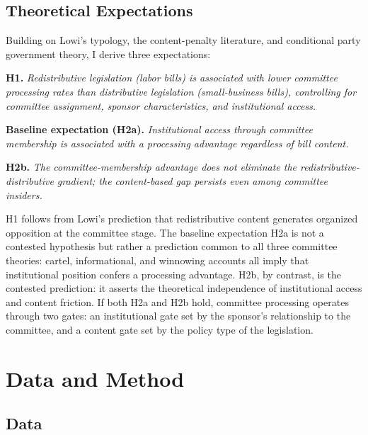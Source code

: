 \documentclass[11pt]{article}
\begin{document}
\subsection{Theoretical Expectations}
\label{sec:lit-expect}

Building on Lowi's typology, the content-penalty literature, and conditional party government theory, I derive three expectations:

\medskip
\noindent\textbf{H1.} \textit{Redistributive legislation (labor bills) is associated with lower committee processing rates than distributive legislation (small-business bills), controlling for committee assignment, sponsor characteristics, and institutional access.}

\medskip
\noindent\textbf{Baseline expectation (H2a).} \textit{Institutional access through committee membership is associated with a processing advantage regardless of bill content.}

\medskip
\noindent\textbf{H2b.} \textit{The committee-membership advantage does not eliminate the redistributive-distributive gradient; the content-based gap persists even among committee insiders.}

\medskip
\noindent H1 follows from Lowi's prediction that redistributive content generates organized opposition at the committee stage. The baseline expectation H2a is not a contested hypothesis but rather a prediction common to all three committee theories: cartel, informational, and winnowing accounts all imply that institutional position confers a processing advantage. H2b, by contrast, is the contested prediction: it asserts the theoretical independence of institutional access and content friction. If both H2a and H2b hold, committee processing operates through two gates: an institutional gate set by the sponsor's relationship to the committee, and a content gate set by the policy type of the legislation.


\section{Data and Method}
\label{sec:method}

\subsection{Data}
\label{sec:data}
\end{document}
